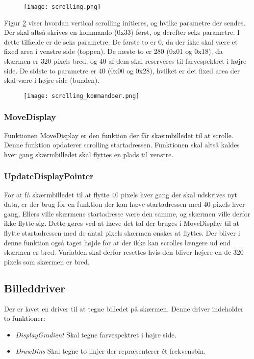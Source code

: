 \begin{figure} [H]
	\centering
	\texttt{[image: scrolling.png]}
	\label{fig:scrolling}
\end{figure}

Figur \ref{fig:scrolling_kommandoer} viser hvordan vertical scrolling initieres, og hvilke parametre der sendes.
Der skal altså skrives en kommando (0x33) først, og derefter seks parametre. I dette tilfælde er de seks parametre:
De første to er 0, da der ikke skal være et fixed area i venstre side (toppen). De næste to er 280 (0x01 og 0x18), da skærmen er 320 pixels bred, og 40 af dem skal reserveres til farvespektret i højre side. De sidste to parametre er 40 (0x00 og 0x28), hvilket er det fixed area der skal være i højre side (bunden).

\begin{figure} [H]
	\centering
	\texttt{[image: scrolling\_kommandoer.png]}
	\label{fig:scrolling_kommandoer}
\end{figure}

\subsubsection{MoveDisplay}
Funktionen MoveDisplay er den funktion der får skærmbilledet til at scrolle. Denne funktion opdaterer scrolling startadressen. Funktionen skal altså kaldes hver gang skærmbilledet skal flyttes en plads til venstre. 

\subsubsection{UpdateDisplayPointer}
For at få skærmbilledet til at flytte 40 pixels hver gang der skal udskrives nyt data, er der brug for en funktion der kan hæve startadressen med 40 pixels hver gang, Ellers ville skærmens startadresse være den samme, og skærmen ville derfor ikke flytte sig. Dette gøres ved at hæve det tal der bruges i MoveDisplay til at flytte startadressen med de antal pixels skærmen ønskes at flyttes. Der bliver i denne funktion også taget højde for at der ikke kan scrolles længere ud end skærmen er bred. Variablen skal derfor resettes hvis den bliver højere en de 320 pixels som skærmen er bred.

\subsection{Billeddriver}
Der er lavet en driver til at tegne billedet på skærmen. Denne driver indeholder to funktioner:
\begin{itemize}
	\item \textit{DisplayGradient} Skal tegne farvespektret i højre side.
	\item \textit{DrawBins} Skal tegne to linjer der repræsenterer ét frekvensbin.
\end{itemize}

